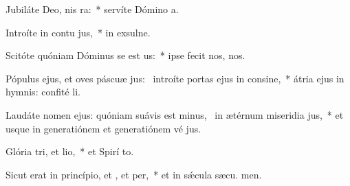\item Jubiláte Deo, nis ra:~* servíte Dómino  a.
\item Introíte in contu jus,~* in exsulne.
\item Scitóte quóniam Dóminus se est us:~* ipse fecit nos,    nos.
\item Pópulus ejus, et oves páscuæ jus:~\pscross{} introíte portas ejus in consine,~* átria ejus in hymnis: confité li.
\item Laudáte nomen ejus: quóniam suávis est minus,~\pscross{} in ætérnum miseridia jus,~* et usque in generatiónem et generatiónem vé jus.
\item Glória tri, et lio,~* et Spirí to.
\item Sicut erat in princípio, et , et per,~* et in sǽcula sæcu. men.
